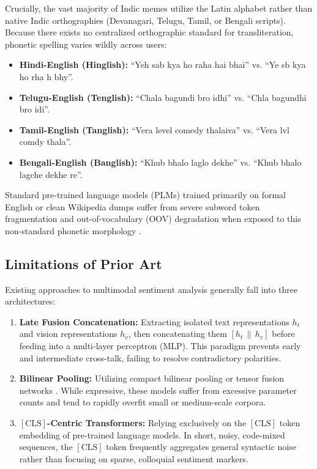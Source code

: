 \documentclass[10pt,journal,compsoc]{IEEEtran}
\begin{document}
Crucially, the vast majority of Indic memes utilize the Latin alphabet rather than native Indic orthographies (Devanagari, Telugu, Tamil, or Bengali scripts). Because there exists no centralized orthographic standard for transliteration, phonetic spelling varies wildly across users:
\begin{itemize}
    \item \textbf{Hindi-English (Hinglish):} ``Yeh sab kya ho raha hai bhai'' vs. ``Ye sb kya ho rha h bhy''.
    \item \textbf{Telugu-English (Tenglish):} ``Chala bagundi bro idhi'' vs. ``Chla bagundhi bro idi''.
    \item \textbf{Tamil-English (Tanglish):} ``Vera level comedy thalaiva'' vs. ``Vera lvl comdy thala''.
    \item \textbf{Bengali-English (Banglish):} ``Khub bhalo laglo dekhe'' vs. ``Khub bhalo lagche dekhe re''.
\end{itemize}
Standard pre-trained language models (PLMs) trained primarily on formal English or clean Wikipedia dumps suffer from severe subword token fragmentation and out-of-vocabulary (OOV) degradation when exposed to this non-standard phonetic morphology \cite{kakwani2020indicnlpsuite, banerjee2018dataset}.

\subsection{Limitations of Prior Art}
Existing approaches to multimodal sentiment analysis generally fall into three architectures:
\begin{enumerate}
    \item \textbf{Late Fusion Concatenation:} Extracting isolated text representations $h_t$ and vision representations $h_v$, then concatenating them $[h_t \,\|\, h_v]$ before feeding into a multi-layer perceptron (MLP). This paradigm prevents early and intermediate cross-talk, failing to resolve contradictory polarities.
    \item \textbf{Bilinear Pooling:} Utilizing compact bilinear pooling \cite{fukui2016multimodal} or tensor fusion networks \cite{zadeh2017tensor}. While expressive, these models suffer from excessive parameter counts and tend to rapidly overfit small or medium-scale corpora.
    \item \textbf{$[\text{CLS}]$-Centric Transformers:} Relying exclusively on the $[\text{CLS}]$ token embedding of pre-trained language models. In short, noisy, code-mixed sequences, the $[\text{CLS}]$ token frequently aggregates general syntactic noise rather than focusing on sparse, colloquial sentiment markers.
\end{enumerate}
\end{document}
